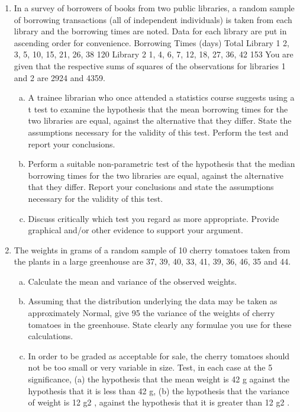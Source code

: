 \begin{enumerate}

\item In a survey of borrowers of books from two public libraries, a random sample of
borrowing transactions (all of independent individuals) is taken from each library and
the borrowing times are noted. Data for each library are put in ascending order for
convenience.
Borrowing Times (days) Total
Library 1 2, 3, 5, 10, 15, 21, 26, 38 120
Library 2 1, 4, 6, 7, 12, 18, 27, 36, 42 153
You are given that the respective sums of squares of the observations for libraries 1
and 2 are 2924 and 4359.
\begin{enumerate}[(a)]
\item A trainee librarian who once attended a statistics course suggests using a t test
to examine the hypothesis that the mean borrowing times for the two libraries
are equal, against the alternative that they differ. State the assumptions
necessary for the validity of this test. Perform the test and report your
conclusions.
\item Perform a suitable non-parametric test of the hypothesis that the median
borrowing times for the two libraries are equal, against the alternative that they
differ. Report your conclusions and state the assumptions necessary for the
validity of this test.
\item Discuss critically which test you regard as more appropriate. Provide
graphical and/or other evidence to support your argument.
\end{enumerate}

\item The weights in grams of a random sample of 10 cherry tomatoes taken from the plants
in a large greenhouse are 37, 39, 40, 33, 41, 39, 36, 46, 35 and 44.
\begin{enumerate}[(a)]
\item Calculate the mean and variance of the observed weights.
\item Assuming that the distribution underlying the data may be taken as
approximately Normal, give 95%
the variance of the weights of cherry tomatoes in the greenhouse. State clearly
any formulae you use for these calculations.
\item In order to be graded as acceptable for sale, the cherry tomatoes should not be
too small or very variable in size. Test, in each case at the 5%
significance, (a) the hypothesis that the mean weight is 42 g against the
hypothesis that it is less than 42 g, (b) the hypothesis that the variance of
weight is 12 g2
, against the hypothesis that it is greater than 12 g2
.
\end{enumerate}
\end{enumerate}

